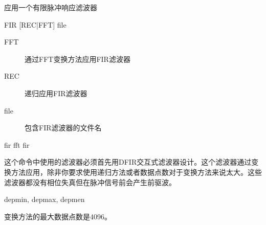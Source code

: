 \label{cmd:fir}

应用一个有限脉冲响应滤波器

\begin{SACSTX}
FIR [REC|FFT] file
\end{SACSTX}

\begin{description}
\item [FFT] 通过FFT变换方法应用FIR滤波器
\item [REC] 递归应用FIR滤波器
\item [file] 包含FIR滤波器的文件名
\end{description}

\begin{SACDFT}
fir fft fir
\end{SACDFT}

这个命令中使用的滤波器必须首先用DFIR交互式滤波器设计。这个滤波器通过变换方法应用，除非你要求使用递归方法或者数据点数对于变换方法来说太大。这些滤波器都没有相位失真但在脉冲信号前会产生前驱波。

depmin, depmax, depmen

变换方法的最大数据点数是4096。
